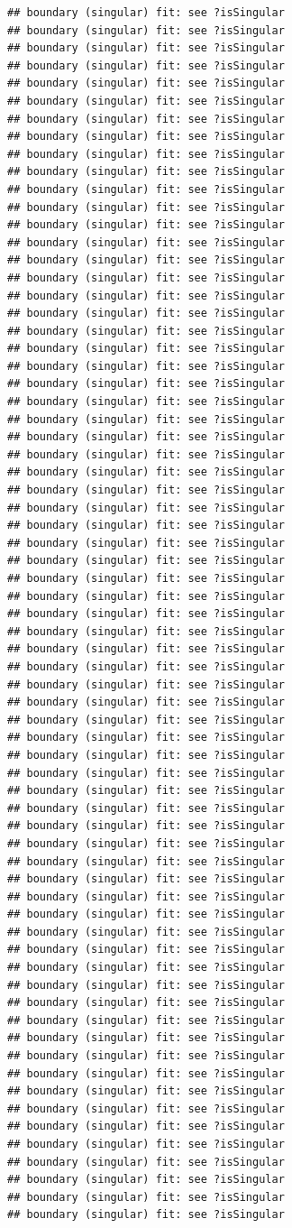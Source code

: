 \documentclass[
]{article}
\begin{document}
\begin{verbatim}
## boundary (singular) fit: see ?isSingular
## boundary (singular) fit: see ?isSingular
## boundary (singular) fit: see ?isSingular
## boundary (singular) fit: see ?isSingular
## boundary (singular) fit: see ?isSingular
## boundary (singular) fit: see ?isSingular
## boundary (singular) fit: see ?isSingular
## boundary (singular) fit: see ?isSingular
## boundary (singular) fit: see ?isSingular
## boundary (singular) fit: see ?isSingular
## boundary (singular) fit: see ?isSingular
## boundary (singular) fit: see ?isSingular
## boundary (singular) fit: see ?isSingular
## boundary (singular) fit: see ?isSingular
## boundary (singular) fit: see ?isSingular
## boundary (singular) fit: see ?isSingular
## boundary (singular) fit: see ?isSingular
## boundary (singular) fit: see ?isSingular
## boundary (singular) fit: see ?isSingular
## boundary (singular) fit: see ?isSingular
## boundary (singular) fit: see ?isSingular
## boundary (singular) fit: see ?isSingular
## boundary (singular) fit: see ?isSingular
## boundary (singular) fit: see ?isSingular
## boundary (singular) fit: see ?isSingular
## boundary (singular) fit: see ?isSingular
## boundary (singular) fit: see ?isSingular
## boundary (singular) fit: see ?isSingular
## boundary (singular) fit: see ?isSingular
## boundary (singular) fit: see ?isSingular
## boundary (singular) fit: see ?isSingular
## boundary (singular) fit: see ?isSingular
## boundary (singular) fit: see ?isSingular
## boundary (singular) fit: see ?isSingular
## boundary (singular) fit: see ?isSingular
## boundary (singular) fit: see ?isSingular
## boundary (singular) fit: see ?isSingular
## boundary (singular) fit: see ?isSingular
## boundary (singular) fit: see ?isSingular
## boundary (singular) fit: see ?isSingular
## boundary (singular) fit: see ?isSingular
## boundary (singular) fit: see ?isSingular
## boundary (singular) fit: see ?isSingular
## boundary (singular) fit: see ?isSingular
## boundary (singular) fit: see ?isSingular
## boundary (singular) fit: see ?isSingular
## boundary (singular) fit: see ?isSingular
## boundary (singular) fit: see ?isSingular
## boundary (singular) fit: see ?isSingular
## boundary (singular) fit: see ?isSingular
## boundary (singular) fit: see ?isSingular
## boundary (singular) fit: see ?isSingular
## boundary (singular) fit: see ?isSingular
## boundary (singular) fit: see ?isSingular
## boundary (singular) fit: see ?isSingular
## boundary (singular) fit: see ?isSingular
## boundary (singular) fit: see ?isSingular
## boundary (singular) fit: see ?isSingular
## boundary (singular) fit: see ?isSingular
## boundary (singular) fit: see ?isSingular
## boundary (singular) fit: see ?isSingular
## boundary (singular) fit: see ?isSingular
## boundary (singular) fit: see ?isSingular
## boundary (singular) fit: see ?isSingular
## boundary (singular) fit: see ?isSingular
## boundary (singular) fit: see ?isSingular
## boundary (singular) fit: see ?isSingular
## boundary (singular) fit: see ?isSingular
## boundary (singular) fit: see ?isSingular
\end{verbatim}
\end{document}
